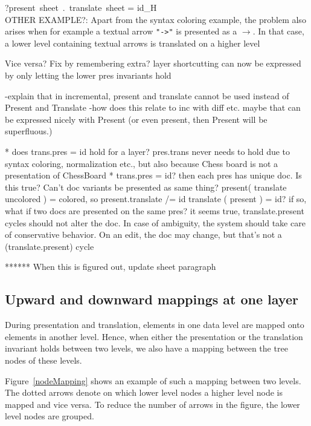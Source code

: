 
\bc
?present~sheet~.~translate~sheet = id_{H}\\

OTHER EXAMPLE?: Apart from the syntax coloring example, the problem also arises when for example a textual arrow 
\verb|"->"| is presented as a $\rightarrow$. In that case, a lower level containing textual arrows is 
translated on a higher level 

Vice versa? Fix by remembering extra?
 layer shortcutting can now be expressed by only letting the lower pres invariants hold

 -explain that in incremental, present and translate cannot be used instead of Present and Translate
 -how does this relate to inc with diff etc. maybe that can be expressed nicely with Present
 (or even present, then Present will be superfluous.)

* does   trans.pres = id hold for a layer? pres.trans never needs to hold due to syntax coloring, normalization etc., but also because Chess board is not a presentation of ChessBoard   
* trans.pres = id? then each pres has unique doc. Is this true? Can't doc variants be presented as same thing?
   present( translate uncolored ) = colored, so present.translate /= id
   translate ( present ) = id? if so, what if two docs are presented on the same pres?
 it seems true, translate.present cycles should not alter the doc. In case of ambiguity, the system should
 take care of conservative behavior. On an edit, the doc may change, but that's not a (translate.present) cycle


 ****** When this is figured out, update sheet paragraph
\ec


%																
\subsection{Upward and downward mappings at one layer} \label{mappingsInLayer}


During presentation and translation, elements in one data level are mapped onto elements in another level. Hence, when either the presentation or the translation invariant holds between two levels, we also have a mapping between the tree nodes of these levels. 

Figure~\ref{nodeMapping} shows an example of such a mapping between two levels. The dotted arrows denote on which lower level nodes a higher level node is mapped and vice versa. To reduce the number of arrows in the figure, the lower level nodes are grouped.

